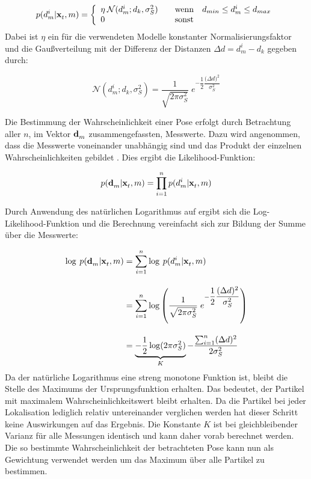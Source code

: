 \begin{equation}
p(d_m^i|\mathbf{x}^{}_{t},m) = \left\lbrace\begin{array}{ll}
\eta \: \mathcal{N}(d_m^i;d_k,\sigma_S^2) & \quad \mathrm{wenn} \quad d_{min}\leq d_m^i \leq d_{max} \\
0 & \quad \mathrm{sonst}
\end{array}
\right.
\end{equation}
Dabei ist $\eta$ ein für die verwendeten Modelle konstanter Normalisierungsfaktor und die Gaußverteilung mit der Differenz der Distanzen $\Delta d = d_m^i-d_k$  gegeben durch:

\begin{equation}
\mathcal{N}(d_m^i;d_k,\sigma_S^2) = \frac{1}{\sqrt{2\pi\sigma_S^2}} \; e^{-\dfrac{1}{2}\dfrac{{(\Delta d})^2}{\sigma_S^2}}
\end{equation}

Die Bestimmung der Wahrscheinlichkeit einer Pose erfolgt durch Betrachtung aller $n$, im Vektor $\mathbf{d}^{}_{m}$ zusammengefassten, Messwerte. Dazu wird angenommen, dass die Messwerte voneinander unabhängig sind und das Produkt der einzelnen Wahrscheinlichkeiten gebildet \cite{Hornung2010}. Dies ergibt die Likelihood-Funktion:

\begin{equation}
\label{eq.likelihood}
p(\mathbf{d}^{}_{m}|\mathbf{x}^{}_{t},m) = \prod_{i=1}^{n}p(d_m^i|\mathbf{x}^{}_{t},m)
\end{equation}

Durch Anwendung des natürlichen Logarithmus auf  ergibt sich die Log-Likelihood-Funktion und die Berechnung vereinfacht sich zur Bildung der Summe über die Messwerte:

\begin{equation}
\begin{split}
\log \: p(\mathbf{d}^{}_{m}|\mathbf{x}^{}_{t},m) & = \sum_{i=1}^{n}\log\: p(d_m^i|\mathbf{x}^{}_{t},m) \\[1em]
& = \sum_{i=1}^{n}\log \left( \frac{1}{\sqrt{2\pi\sigma_S^2}} \; e^{-\dfrac{1}{2}\dfrac{{(\Delta d})^2}{\sigma_S^2}} \right)\\[1em]
& = \underbrace{-\frac{1}{2}\log(2\pi\sigma_S^2)}_K-\dfrac{\sum_{i=1}^{n}(\Delta d)^2}{2\sigma_S^2}
\end{split}
\end{equation}
Da der natürliche Logarithmus eine streng monotone Funktion ist, bleibt die Stelle des Maximums der Ursprungsfunktion erhalten. Das bedeutet, der Partikel mit maximalem Wahrscheinlichkeitswert bleibt erhalten. Da die Partikel bei jeder Lokalisation lediglich relativ untereinander verglichen werden hat dieser Schritt keine Auswirkungen auf das Ergebnis. Die Konstante $K$ ist bei gleichbleibender Varianz für alle Messungen identisch und kann daher vorab berechnet werden.\\
Die so bestimmte Wahrscheinlichkeit der betrachteten Pose kann nun als Gewichtung verwendet werden um das Maximum über alle Partikel zu bestimmen. 

